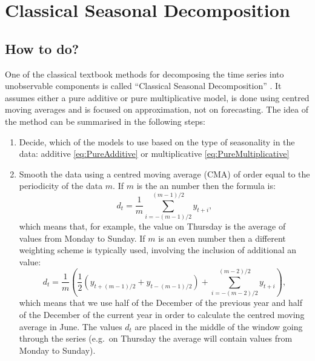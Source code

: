 \documentclass[
]{book}
\providecommand{\tightlist}{%
  \setlength{\itemsep}{0pt}\setlength{\parskip}{0pt}}
\theoremstyle{definition}
\theoremstyle{definition}
\theoremstyle{definition}
\theoremstyle{definition}
\theoremstyle{remark}
\begin{document}
\hypertarget{ClassicalDecomposition}{%
\section{Classical Seasonal Decomposition}\label{ClassicalDecomposition}}

\hypertarget{how-to-do}{%
\subsection{How to do?}\label{how-to-do}}

One of the classical textbook methods for decomposing the time series into unobservable components is called ``Classical Seasonal Decomposition'' \citep{Persons1919}. It assumes either a pure additive or pure multiplicative model, is done using centred moving averages and is focused on approximation, not on forecasting. The idea of the method can be summarised in the following steps:

\begin{enumerate}
\def\labelenumi{\arabic{enumi}.}
\tightlist
\item
  Decide, which of the models to use based on the type of seasonality in the data: additive \eqref{eq:PureAdditive} or multiplicative \eqref{eq:PureMultiplicative}
\item
  Smooth the data using a centred moving average (CMA) of order equal to the periodicity of the data \(m\). If \(m\) is the an number then the formula is:
  \begin{equation}
   d_t = \frac{1}{m}\sum_{i=-(m-1)/2}^{(m-1)/2} y_{t+i},
   \label{eq:CMAOdd}
  \end{equation}
  which means that, for example, the value on Thursday is the average of values from Monday to Sunday. If \(m\) is an even number then a different weighting scheme is typically used, involving the inclusion of additional an value:
  \begin{equation}
   d_t = \frac{1}{m}\left(\frac{1}{2}\left(y_{t+(m-1)/2}+y_{t-(m-1)/2}\right) + \sum_{i=-(m-2)/2}^{(m-2)/2} y_{t+i}\right),
   \label{eq:CMAEven}
  \end{equation}
  which means that we use half of the December of the previous year and half of the December of the current year in order to calculate the centred moving average in June. The values \(d_t\) are placed in the middle of the window going through the series (e.g.~on Thursday the average will contain values from Monday to Sunday).
\end{enumerate}
\end{document}
